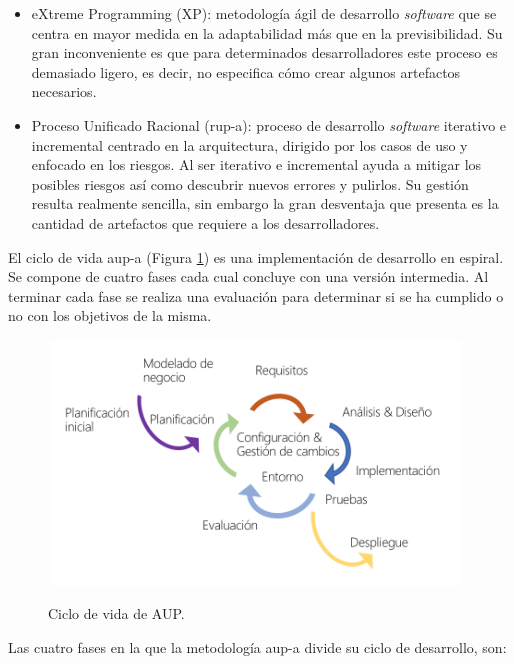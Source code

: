 \documentclass[12pt,a4paper, twoside]{report}
\begin{document}
	\begin{itemize}
		\item eXtreme Programming (XP): metodología ágil de desarrollo \textit{software} que se centra en mayor medida en la adaptabilidad más que en la previsibilidad. Su gran inconveniente es que para determinados desarrolladores este proceso es demasiado ligero, es decir, no especifica cómo crear algunos artefactos necesarios.
		
		\item Proceso Unificado Racional (\gls{rup-a}): proceso de desarrollo \textit{software} iterativo e incremental centrado en la arquitectura, dirigido por los casos de uso y enfocado en los riesgos. Al ser iterativo e incremental ayuda a mitigar los posibles riesgos así como descubrir nuevos errores y pulirlos. Su gestión resulta realmente sencilla, sin embargo la gran desventaja que presenta es la cantidad de artefactos que requiere a los desarrolladores.
	\end{itemize}
	
	El ciclo de vida \gls{aup-a} (Figura \ref{fig:plannig-aup}) es una implementación de desarrollo en espiral. Se compone de cuatro fases cada cual concluye con una versión intermedia. Al terminar cada fase se realiza una evaluación para determinar si se ha cumplido o no con los objetivos de la misma.
		
	\begin{figure}[!ht]   
		\caption{Ciclo de vida de AUP.} 
		\begin{center} 
	 		\includegraphics[width=11cm,height=6.5cm]{Images/planning/life_cycle} \\
			\label{fig:plannig-aup} 
		\end{center}  
	\end{figure}
	
	Las cuatro fases en la que la metodología \gls{aup-a} divide su ciclo de desarrollo, son:
	
\end{document}

